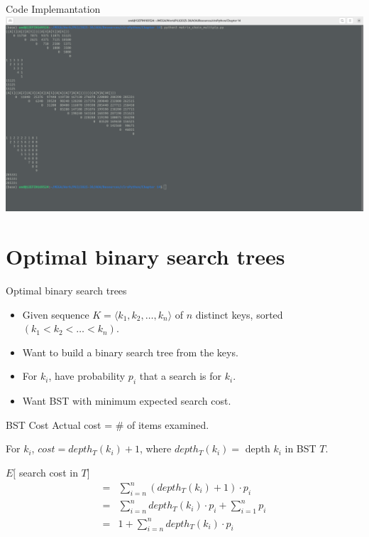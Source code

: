 \documentclass[aspectratio=169]{beamer}
\begin{document}
\begin{frame}{Code Implemantation}
    \centering
    \includegraphics[width=\textwidth]{figures/matrix_chain_multiplication}
\end{frame}

\section{Optimal binary search trees}

\begin{frame}{Optimal binary search trees}
    \begin{itemize}
        \item Given sequence $K = \langle k_1, k_2, \ldots, k_n \rangle$ of $n$ distinct keys, sorted $(k_1 < k_2 < \ldots < k_n)$.
        \item Want to build a binary search tree from the keys.
        \item For $k_i$, have probability $p_i$ that a search is for $k_i$.
        \item Want BST with minimum expected search cost.
    \end{itemize}
\end{frame}

\begin{frame}{BST Cost}
    Actual cost = \# of items examined.
    \begin{center}
        \footnotesize
        For $k_i$, $cost = depth_T (k_i) + 1$, where $depth_T (k_i) =$ depth $k_i$ in BST $T$.
    \end{center}
    $E[$ search cost in $T]$
    \begin{equation*}
        \begin{align*}
            =& \sum_{i=n}^{n} (depth_T(k_i) + 1) \cdot p_i \\
            =& \sum_{i=n}^{n} depth_T(k_i) \cdot p_i + \sum_{i=1}^{n} p_i \\
            =& 1 + \sum_{i=n}^{n} depth_T(k_i) \cdot p_i
        \end{align*}
    \end{equation*}
\end{frame}
\end{document}
